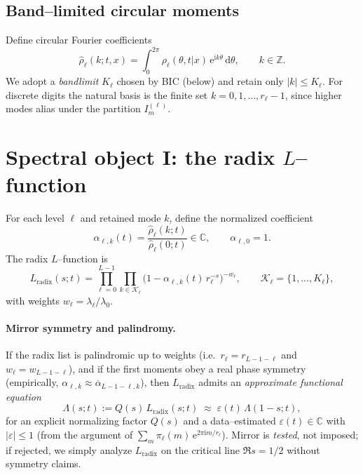 \documentclass[11pt]{article}
\newcommand{\C}{\mathbb{C}}
\newcommand{\Z}{\mathbb{Z}}
\newcommand{\ud}{\mathrm{d}}
\newcommand{\e}{\mathrm{e}}
\newcommand{\ii}{\mathrm{i}}
\begin{document}
\subsection{Band--limited circular moments}
Define circular Fourier coefficients
\begin{equation}
\widehat{\rho}_\ell(k;t,x)=\int_{0}^{2\pi}\rho_\ell(\theta,t|x)\,\e^{\ii k\theta}\,\ud\theta,\qquad k\in\Z.
\end{equation}
We adopt a \emph{bandlimit} $K_\ell$ chosen by BIC (below) and retain only $|k|\le K_\ell$.
For discrete digits the natural basis is the finite set $k=0,1,\dots,r_\ell-1$, since higher modes alias under the partition $I_m^{(\ell)}$.

\section{Spectral object I: the radix $L$--function}
\label{sec:Lradix}
For each level $\ell$ and retained mode $k$, define the normalized coefficient
\begin{equation}
\alpha_{\ell,k}(t)=\frac{\widehat{\rho}_\ell(k;t)}{\widehat{\rho}_\ell(0;t)}\in\C,\qquad \alpha_{\ell,0}=1.
\end{equation}
The radix $L$--function is
\begin{equation}
L_{\mathrm{radix}}(s;t)=\prod_{\ell=0}^{L-1}\prod_{k\in \mathcal{K}_\ell}\bigl(1-\alpha_{\ell,k}(t)\,r_\ell^{-s}\bigr)^{-w_\ell},\qquad \mathcal{K}_\ell=\{1,\dots,K_\ell\},
\label{eq:Lradix}
\end{equation}
with weights $w_\ell=\lambda_\ell/\lambda_0$.
\paragraph{Mirror symmetry and palindromy.}
If the radix list is palindromic up to weights (i.e.\ $r_\ell=r_{L-1-\ell}$ and $w_\ell=w_{L-1-\ell}$), and if the first moments obey a real phase symmetry (empirically, $\alpha_{\ell,k}\approx \overline{\alpha}_{L-1-\ell,k}$), then $L_{\mathrm{radix}}$ admits an \emph{approximate functional equation}
\begin{equation}
\Lambda(s;t):=Q(s)\,L_{\mathrm{radix}}(s;t)\;\approx\;\varepsilon(t)\,\Lambda(1-s;t),
\end{equation}
for an explicit normalizing factor $Q(s)$ and a data--estimated $\varepsilon(t)\in\C$ with $|\varepsilon|\le 1$ (from the argument of $\sum_m \pi_\ell(m)\,\e^{2\pi\ii m/r_\ell}$).
Mirror is \emph{tested}, not imposed; if rejected, we simply analyze $L_{\mathrm{radix}}$ on the critical line $\Re s=1/2$ without symmetry claims.
\end{document}
